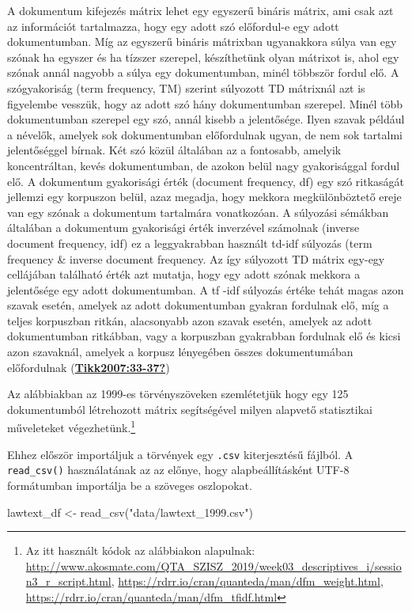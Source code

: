 \documentclass[
]{book}
\newenvironment{Shaded}{\begin{snugshade}}{\end{snugshade}}
\newcommand{\FunctionTok}[1]{\textcolor[rgb]{0.00,0.00,0.00}{#1}}
\newcommand{\NormalTok}[1]{#1}
\newcommand{\OtherTok}[1]{\textcolor[rgb]{0.56,0.35,0.01}{#1}}
\newcommand{\StringTok}[1]{\textcolor[rgb]{0.31,0.60,0.02}{#1}}
\begin{document}
A dokumentum kifejezés mátrix lehet egy egyszerű bináris mátrix, ami
csak azt az információt tartalmazza, hogy egy adott szó előfordul-e egy
adott dokumentumban. Míg az egyszerű bináris mátrixban ugyanakkora súlya
van egy szónak ha egyszer és ha tízszer szerepel, készíthetünk olyan
mátrixot is, ahol egy szónak annál nagyobb a súlya egy dokumentumban,
minél többször fordul elő. A szógyakoriság (term frequency, TM) szerint
súlyozott TD mátrixnál azt is figyelembe vesszük, hogy az adott szó hány
dokumentumban szerepel. Minél több dokumentumban szerepel egy szó, annál
kisebb a jelentősége. Ilyen szavak például a névelők, amelyek sok
dokumentumban előfordulnak ugyan, de nem sok tartalmi jelentőséggel
bírnak. Két szó közül általában az a fontosabb, amelyik koncentráltan,
kevés dokumentumban, de azokon belül nagy gyakorisággal fordul elő. A
dokumentum gyakorisági érték (document frequency, df) egy szó ritkaságát
jellemzi egy korpuszon belül, azaz megadja, hogy mekkora megkülönböztető
ereje van egy szónak a dokumentum tartalmára vonatkozóan. A súlyozási
sémákban általában a dokumentum gyakorisági érték inverzével számolnak
(inverse document frequency, idf) ez a leggyakrabban használt td-idf
súlyozás (term frequency \& inverse document frequency. Az így súlyozott
TD mátrix egy-egy cellájában található érték azt mutatja, hogy egy adott
szónak mekkora a jelentősége egy adott dokumentumban. A tf -idf súlyozás
értéke tehát magas azon szavak esetén, amelyek az adott dokumentumban
gyakran fordulnak elő, míg a teljes korpuszban ritkán, alacsonyabb azon
szavak esetén, amelyek az adott dokumentumban ritkábban, vagy a
korpuszban gyakrabban fordulnak elő és kicsi azon szavaknál, amelyek a
korpusz lényegében összes dokumentumában előfordulnak
(\protect\hyperlink{ref-Tikk2007:33-37}{\textbf{Tikk2007:33-37?}})

Az alábbiakban az 1999-es törvényszöveken szemlétetjük hogy egy 125
dokumentumból létrehozott mátrix segítségével milyen alapvető
statisztikai műveleteket végezhetünk.\footnote{Az itt használt kódok az
  alábbiakon alapulnak:
  \url{http://www.akosmate.com/QTA_SZISZ_2019/week03_descriptives_i/session3_r_script.html},
  \url{https://rdrr.io/cran/quanteda/man/dfm_weight.html},
  \url{https://rdrr.io/cran/quanteda/man/dfm_tfidf.html}}

Ehhez először importáljuk a törvények egy \texttt{.csv} kiterjesztésű
fájlból. A \texttt{read\_csv()} használatának az az előnye, hogy
alapbeállításként UTF-8 formátumban importálja be a szöveges oszlopokat.

\begin{Shaded}
\begin{Highlighting}[]

\NormalTok{lawtext\_df }\OtherTok{\textless{}{-}} \FunctionTok{read\_csv}\NormalTok{(}\StringTok{"data/lawtext\_1999.csv"}\NormalTok{)}
\end{Highlighting}
\end{Shaded}
\end{document}
